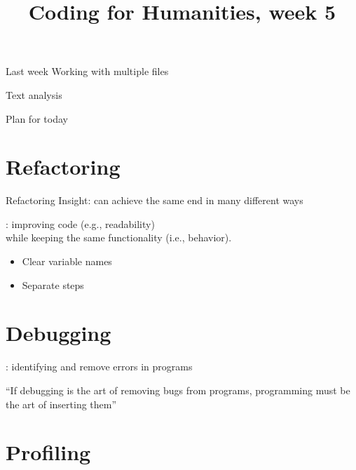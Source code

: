 \documentclass[aspectratio=169,usenames,dvipsnames]{beamer}
\title{Coding for Humanities, week 5}
\begin{document}
\begin{frame}
 \titlepage
\end{frame}

\begin{frame}{Last week}
    Working with multiple files

    Text analysis
\end{frame}

\begin{frame}{Plan for today}
 \tableofcontents
\end{frame}


\section{Refactoring}
\frame{\tableofcontents[currentsection]}

\begin{frame}{Refactoring}
	Insight: can achieve the same end in many different ways

	\pause
	\begin{definition}
		: improving code (e.g., readability) \\
			while keeping the same functionality (i.e., behavior).
	\end{definition}

	\begin{itemize}
		\item Clear variable names
		\item Separate steps
	\end{itemize}
\end{frame}

\section{Debugging}
\frame{\tableofcontents[currentsection]}
\begin{frame}
    \begin{definition}
        : identifying and remove errors in programs
    \end{definition}

    \pause

    ``If debugging is the art of removing bugs from programs,
    programming must be the art of inserting them''

\end{frame}


\section{Profiling}
\frame{\tableofcontents[currentsection]}
\end{document}
